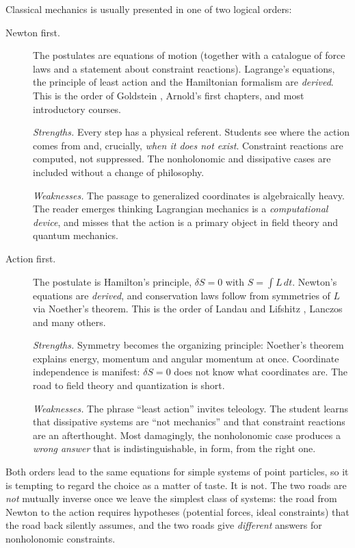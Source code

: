 Classical mechanics is usually presented in one of two logical orders:
\begin{description} \item[Newton first.] The postulates are equations of motion
            (together with a catalogue of force laws and a statement about
            constraint reactions). Lagrange's equations, the principle of least
            action and the Hamiltonian formalism are \emph{derived}. This is
        the order of Goldstein \cite{GoldsteinPooleSafko2000}, Arnold's \cite{Arnold1989}
    first chapters, and most introductory courses. 

\emph{Strengths.} Every step has a physical referent. Students see where
the action comes from and, crucially, \emph{when it does not exist}.
Constraint reactions are computed, not suppressed. The nonholonomic
and dissipative cases are included without a change of philosophy.

\emph{Weaknesses.} The passage to generalized coordinates is algebraically
heavy. The reader emerges thinking Lagrangian mechanics is a
\emph{computational device}, and misses that the action is a primary
object in field theory and quantum mechanics.

\item[Action first.] The
        postulate is Hamilton's principle, $\delta S=0$ with $S=\int L\,dt$.
        Newton's equations are \emph{derived}, and conservation laws follow
        from symmetries of $L$ via Noether's theorem. This is the order of
        Landau and Lifshitz \cite{LandauLifshitz-1}, Lanczos \cite{Lanczos1970}
and many others. 

\emph{Strengths.} Symmetry becomes the organizing principle:
Noether's theorem explains energy, momentum and angular momentum at once.
Coordinate independence is manifest: $\delta S=0$ does not know what
coordinates are. The road to field theory and quantization is short.

\emph{Weaknesses.} The phrase ``least action'' invites teleology. The student
learns that dissipative systems are ``not mechanics'' and that constraint
reactions are an afterthought. Most damagingly, the nonholonomic case produces
a \emph{wrong answer} that is indistinguishable, in form, from the right one.
\end{description} 

Both orders lead to the same equations for simple systems of point particles,
so it is tempting to regard the choice as a matter of taste. It is not. The two
roads are \emph{not} mutually inverse once we leave the simplest class of
systems: the road from Newton to the action requires hypotheses (potential
forces, ideal constraints) that the road back silently assumes, and the two
roads give \emph{different} answers for nonholonomic constraints. 

